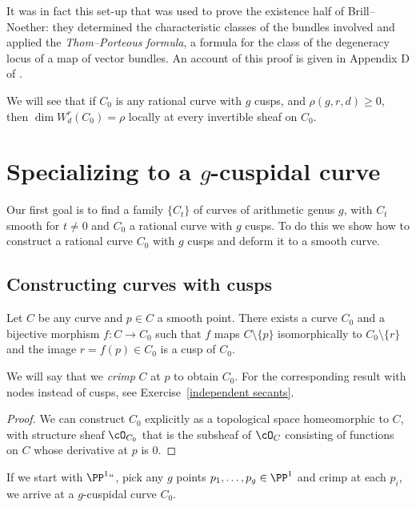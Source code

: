 It was in fact this set-up that was used 
to prove the existence half of
Brill--Noether: they determined the characteristic classes of the bundles
involved and applied the 
%
\emph{Thom--Porteous formula}, a formula for the
class of the degeneracy locus of a map of vector bundles. An account of
this proof is given in Appendix D of \cite{3264}.

We will see that if $C_{0}$ is any rational curve
with $g$ cusps, and $\rho(g,r,d)\geq 0$, then $\dim W^r_d(C_0) = \rho$
locally at every invertible sheaf on $C_{0}$.

\section{Specializing to a $g$-cuspidal curve}

Our first goal is to find a family $\{C_t\}$ of curves of arithmetic
genus $g$, with $C_t$ smooth for $t \neq 0$ and $C_0$ a rational curve
with $g$ cusps. To do this we show how to construct a rational curve $C_0$
with $g$ cusps and deform it to a smooth curve.

\subsection*{Constructing curves with cusps}

\begin{proposition}
Let $C$ be any curve and $p \in C$ a smooth point. There exists a curve
$C_0$ and a bijective morphism $f : C \to C_0$ such that  $f$ maps $C
\setminus \{p\}$ isomorphically to $C_0 \setminus \{r\}$ and the image
$r=f(p) \in C_0$ is a cusp of $C_0$.
\unif
\end{proposition}

We will say that we 
%
\emph{crimp} $C$ at $p$ to obtain $C_{0}$. For
the corresponding result with nodes instead of cusps, see
Exercise~\ref{independent secants}.

\begin{proof}
We can construct $C_0$ explicitly as a topological space homeomorphic
to $C$, with structure sheaf $\cO_{C_0}$ that is
the subsheaf of $\cO_C$ consisting of functions on $C$ whose derivative
at $p$ is 0.
\end{proof}

If we start with $\PP^1` `$, pick any $g$ points $p_1,\dots, p_g \in
\PP^1$ and crimp at each $p_i$, we arrive at a $g$-cuspidal curve $C_0$.


